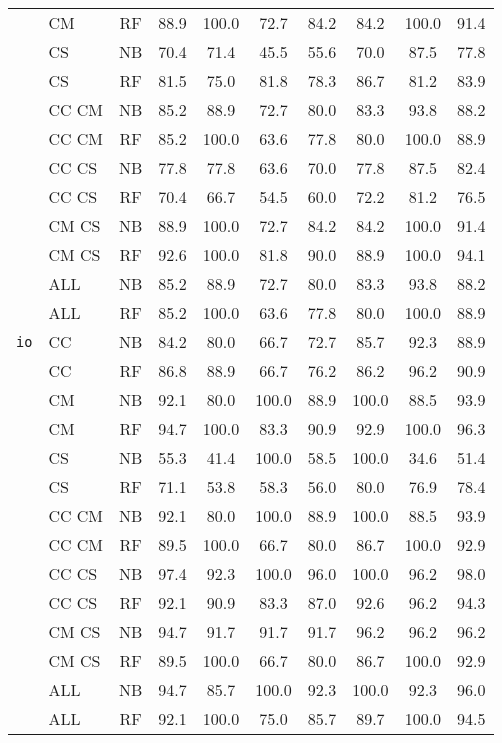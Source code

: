 {\begin{tabular}{l l c | c | c c c | c c c}
& CM & RF & 88.9 & 100.0 & 72.7 & 84.2 & 84.2 & 100.0 & 91.4 \\
& CS & NB & 70.4 & 71.4 & 45.5 & 55.6 & 70.0 & 87.5 & 77.8 \\
& CS & RF & 81.5 & 75.0 & 81.8 & 78.3 & 86.7 & 81.2 & 83.9 \\
& CC CM & NB & 85.2 & 88.9 & 72.7 & 80.0 & 83.3 & 93.8 & 88.2 \\
& CC CM & RF & 85.2 & 100.0 & 63.6 & 77.8 & 80.0 & 100.0 & 88.9 \\
& CC CS & NB & 77.8 & 77.8 & 63.6 & 70.0 & 77.8 & 87.5 & 82.4 \\
& CC CS & RF & 70.4 & 66.7 & 54.5 & 60.0 & 72.2 & 81.2 & 76.5 \\
& CM CS & NB & 88.9 & 100.0 & 72.7 & 84.2 & 84.2 & 100.0 & 91.4 \\
& CM CS & RF & 92.6 & 100.0 & 81.8 & 90.0 & 88.9 & 100.0 & 94.1 \\
& ALL & NB & 85.2 & 88.9 & 72.7 & 80.0 & 83.3 & 93.8 & 88.2 \\
& ALL & RF & 85.2 & 100.0 & 63.6 & 77.8 & 80.0 & 100.0 & 88.9 \\
{\tt io}
& CC & NB & 84.2 & 80.0 & 66.7 & 72.7 & 85.7 & 92.3 & 88.9 \\
& CC & RF & 86.8 & 88.9 & 66.7 & 76.2 & 86.2 & 96.2 & 90.9 \\
& CM & NB & 92.1 & 80.0 & 100.0 & 88.9 & 100.0 & 88.5 & 93.9 \\
& CM & RF & 94.7 & 100.0 & 83.3 & 90.9 & 92.9 & 100.0 & 96.3 \\
& CS & NB & 55.3 & 41.4 & 100.0 & 58.5 & 100.0 & 34.6 & 51.4 \\
& CS & RF & 71.1 & 53.8 & 58.3 & 56.0 & 80.0 & 76.9 & 78.4 \\
& CC CM & NB & 92.1 & 80.0 & 100.0 & 88.9 & 100.0 & 88.5 & 93.9 \\
& CC CM & RF & 89.5 & 100.0 & 66.7 & 80.0 & 86.7 & 100.0 & 92.9 \\
& CC CS & NB & 97.4 & 92.3 & 100.0 & 96.0 & 100.0 & 96.2 & 98.0 \\
& CC CS & RF & 92.1 & 90.9 & 83.3 & 87.0 & 92.6 & 96.2 & 94.3 \\
& CM CS & NB & 94.7 & 91.7 & 91.7 & 91.7 & 96.2 & 96.2 & 96.2 \\
& CM CS & RF & 89.5 & 100.0 & 66.7 & 80.0 & 86.7 & 100.0 & 92.9 \\
& ALL & NB & 94.7 & 85.7 & 100.0 & 92.3 & 100.0 & 92.3 & 96.0 \\
& ALL & RF & 92.1 & 100.0 & 75.0 & 85.7 & 89.7 & 100.0 & 94.5 \\

\end{tabular}}
